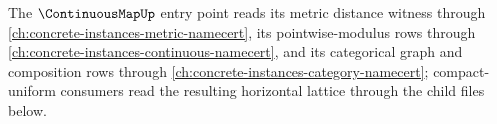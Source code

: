 The $\ContinuousMapUp$ entry point reads its metric distance witness through
\autoref{ch:concrete-instances-metric-namecert}, its pointwise-modulus rows
through \autoref{ch:concrete-instances-continuous-namecert}, and its
categorical graph and composition rows through
\autoref{ch:concrete-instances-category-namecert}; compact-uniform consumers
read the resulting horizontal lattice through the child files below.





